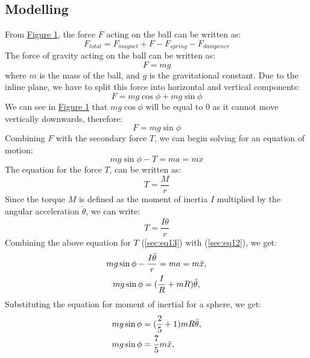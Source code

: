 \documentclass[a4paper,10pt,reqno]{amsart}
\numberwithin{equation}{section}
\begin{document}
\subsection{Modelling}
From \hyperref[fig:system]{Figure 1}, the force $F$ acting on the ball can be written as:
\begin{equation}
\label{sec:eq11}
    F_{total}=F_{magnet}+F-F_{spring}-F_{dampener}
\end{equation}
The force of gravity acting on the ball can be written as:
\begin{equation*}
    F=mg
\end{equation*}
where $m$ is the mass of the ball, and $g$ is the gravitational constant. Due to the inline plane, we have to split this force into horizontal and vertical components:
\begin{equation*}
    F=mg\cos{\phi}+mg\sin{\phi}
\end{equation*}
We can see in \hyperref[fig:system]{Figure 1} that $mg\cos{\phi}$ will be equal to 0 as it cannot move vertically downwards, therefore:
\begin{equation*}
    F=mg\sin{\phi}
\end{equation*}
Combining $F$ with the secondary force $T$, we can begin solving for an equation of motion:
\begin{equation}
\label{sec:eq12}
    mg\sin{\phi}-T=ma=m\ddot x
\end{equation}
The equation for the force $T$, can be written as:
\begin{equation*}
    T=\frac{M}{r}
\end{equation*}
Since the torque $M$ is defined as the moment of inertia $I$ multiplied by the angular acceleration $\ddot \theta$, we can write:
\begin{equation}
\label{sec:eq13}
    T=\frac{I\ddot \theta}{r}
\end{equation}
Combining the above equation for $T$ (\ref{sec:eq13}) with (\ref{sec:eq12}), we get:
\begin{gather*}
    \notag mg\sin{\phi}-\frac{I\ddot \theta}{r}=ma=m\ddot x, \\
    \notag mg\sin{\phi}=(\frac{I}{R}+mR)\ddot \theta, \\
\end{gather*}  
Substituting the equation for moment of inertial for a sphere, we get:
\begin{align*}
    \notag mg\sin{\phi}&=(\frac{2}{5}+1)mR\ddot \theta, \\
    \notag mg\sin{\phi}&=\frac{7}{5}m\ddot x, \\
\end{align*}
\end{document}
